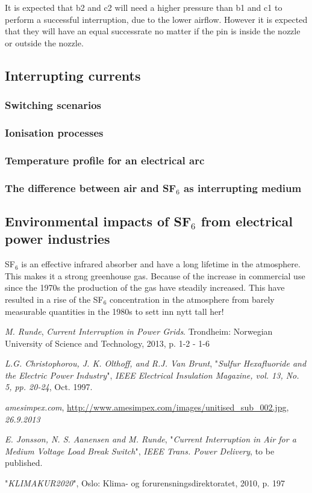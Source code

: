 \documentclass[10pt,a4paper]{article}
\begin{document}
It is expected that b2 and c2 will need a higher pressure than b1 and c1 to perform a successful interruption, due to the lower airflow. However it is expected that they will have an equal successrate no matter if the pin is inside the nozzle or outside the nozzle.
\newpage
\subsection{Interrupting currents} \label{sec:InterruptCurrent}
\subsubsection{Switching scenarios}
\subsubsection{Ionisation processes}
\subsubsection{Temperature profile for an electrical arc}
\subsubsection{The difference between air and SF$_6$ as interrupting medium}
\newpage
\subsection{Environmental impacts of SF$_6$ from electrical power industries}
SF$_6$ is an effective infrared absorber and have a long lifetime in the atmosphere. This makes it a strong greenhouse gas. Because of the increase in commercial use since the 1970s the production of the gas have steadily increased. This have resulted in a rise of the SF$_6$ concentration in the atmosphere from barely measurable quantities in the 1980s \cite{bib:SF6PI} to sett inn nytt tall her!
\newpage

\begin{thebibliography}{10}


 \textit{M. Runde}, \textit{Current Interruption in Power Grids}. Trondheim: Norwegian University of Science and Technology, 2013, p. 1-2 - 1-6

 \textit{L.G. Christophorou, J. K. Olthoff, and R.J. Van Brunt}, "\textit{Sulfur Hexafluoride and the Electric Power Industry}", \textit{IEEE Electrical Insulation Magazine, vol. 13, No. 5, pp. 20-24}, Oct. 1997.

 \textit{amesimpex.com}, \url{http://www.amesimpex.com/images/unitised_sub_002.jpg}, \textit{26.9.2013}

 \textit{E. Jonsson, N. S. Aanensen and M. Runde}, "\textit{Current Interruption in Air for a Medium Voltage Load Break Switch}", \textit{IEEE Trans. Power Delivery}, to be published.

 "\textit{KLIMAKUR2020}", Oslo: Klima- og forurensningsdirektoratet, 2010, p. 197
\end{thebibliography}
\end{document}
